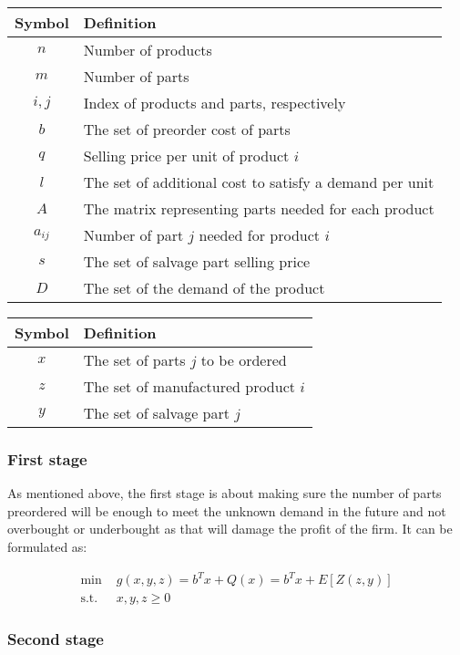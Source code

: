 		\begin{center}
		\begin{tabular}{|c|l|}
		\hline
		\textbf{Symbol} & \textbf{Definition}\\
		\hline 
		\multirow{1}{*}{$n$} & \multirow{1}{*}{Number of products}\\
		\hline
		\multirow{1}{*}{$m$} & \multirow{1}{*}{Number of parts}\\
		\hline
		\multirow{1}{*}{$i, j$} & \multirow{1}{*}{Index of products and parts, respectively}\\
		\hline
		\multirow{1}{*}{$b$} & \multirow{1}{*}{The set of preorder cost of parts}\\
		\hline
		\multirow{1}{*}{$q$} & \multirow{1}{*}{Selling price per unit of product $i$}\\
		\hline
		\multirow{1}{*}{$l$} & \multirow{1}{*}{The set of additional cost to satisfy a demand per unit}\\
		\hline
		\multirow{1}{*}{$A$} & \multirow{1}{*}{The matrix representing parts needed for each product}\\
		\hline
		\multirow{1}{*}{$a_{ij}$} & \multirow{1}{*}{Number of part $j$ needed for product $i$}\\
		\hline
		\multirow{1}{*}{$s$} & \multirow{1}{*}{The set of salvage part selling price}\\
		\hline
		\multirow{1}{*}{$D$} & \multirow{1}{*}{The set of the demand of the product}\\
		\hline
		\end{tabular}
		\end{center}

		\begin{center}
		\begin{tabular}{|c|l|}
		\hline
		\textbf{Symbol} & \textbf{Definition}\\
		\hline 
		\multirow{1}{*}{$x$} & \multirow{1}{*}{The set of parts $j$ to be ordered}\\
		\hline
		\multirow{1}{*}{$z$} & \multirow{1}{*}{The set of manufactured product $i$}\\
		\hline
		\multirow{1}{*}{$y$} & \multirow{1}{*}{The set of salvage part $j$}\\
		\hline
		\end{tabular}
		\end{center}

		\subsubsection{First stage}
		\qquad As mentioned above, the first stage is about making sure the number of parts preordered will be enough to meet the unknown demand in the future and not overbought or underbought as that will damage the profit of the firm. It can be formulated as:

		\begin{align*}
			\text{min } & g(x,y,z) = b^Tx + Q(x) = b^Tx + E[Z(z,y)] \\
			\text{s.t. } & x,y,z \geq 0
		\end{align*}

		\subsubsection{Second stage}
		

		
